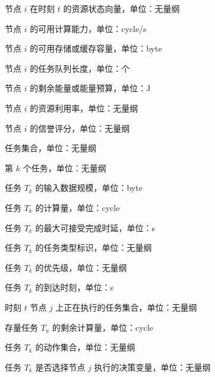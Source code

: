 \begin{symbols}
  \item[$R_i(t)$] 节点 $i$ 在时刻 $t$ 的资源状态向量，单位：无量纲
  \item[$F_i(t)$] 节点 $i$ 的可用计算能力，单位：cycle/s
  \item[$M_i(t)$] 节点 $i$ 的可用存储或缓存容量，单位：byte
  \item[$Q_i(t)$] 节点 $i$ 的任务队列长度，单位：个
  \item[$E_i(t)$] 节点 $i$ 的剩余能量或能量预算，单位：J
  \item[$\rho_i(t)$] 节点 $i$ 的资源利用率，单位：无量纲
  \item[$\mathrm{Rep}_i(t)$] 节点 $i$ 的信誉评分，单位：无量纲
  \item[$\mathcal{T}$] 任务集合，单位：无量纲
  \item[$T_k$] 第 $k$ 个任务，单位：无量纲
  \item[$s_k$] 任务 $T_k$ 的输入数据规模，单位：byte
  \item[$c_k$] 任务 $T_k$ 的计算量，单位：cycle
  \item[$d_k$] 任务 $T_k$ 的最大可接受完成时延，单位：s
  \item[$\tau_k$] 任务 $T_k$ 的任务类型标识，单位：无量纲
  \item[$\zeta_k$] 任务 $T_k$ 的优先级，单位：无量纲
  \item[$t_k^{\mathrm{arr}}$] 任务 $T_k$ 的到达时刻，单位：s
  \item[$\mathcal{Q}_j(t)$] 时刻 $t$ 节点 $j$ 上正在执行的任务集合，单位：无量纲
  \item[$c_u^{\mathrm{rem}}(t)$] 存量任务 $T_u$ 的剩余计算量，单位：cycle
  \item[$\mathcal{A}_k(t)$] 任务 $T_k$ 的动作集合，单位：无量纲
  \item[$x_{k,j}(t)$] 任务 $T_k$ 是否选择节点 $j$ 执行的决策变量，单位：无量纲


\end{symbols}
